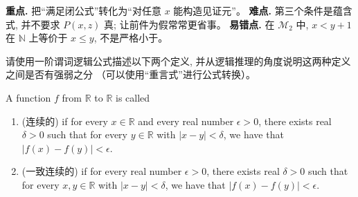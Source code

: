 \documentclass[a4paper, justified]{tufte-handout}
\begin{document}
\begin{solution}
  \begin{remark}
    \textbf{重点.} 把“满足闭公式”转化为“对任意 $x$ 能构造见证元”。
    \textbf{难点.} 第三个条件是蕴含式, 并不要求 $P(x, z)$ 真; 让前件为假常常更省事。
    \textbf{易错点.} 在 $\mathcal{M}_{2}$ 中, $x < y + 1$ 在 $\mathbb{N}$ 上等价于 $x \le y$, 不是严格小于。
  \end{remark}
\end{solution}

\newpage
\begin{problem}
  请使用一阶谓词逻辑公式描述以下两个定义,
  并从逻辑推理的角度说明这两种定义之间是否有强弱之分
  （可以使用``重言式''进行公式转换）。

  A function $f$ from $\mathbb{R}$ to $\mathbb{R}$ is called
  \begin{enumerate}[(1)]
    \setlength{\itemsep}{10pt}
    \item {} (连续的) if
      for every $x \in \mathbb{R}$
      and every real number $\epsilon > 0$,
      there exists real $\delta > 0$ such that
      for every $y \in \mathbb{R}$ with $|x - y| < \delta$,
      we have that $|f(x) -  f(y)|< \epsilon$.
    \item {} (一致连续的) if
      for every real number $\epsilon > 0$,
      there exists real $\delta > 0$ such that
      for every $x, y \in \mathbb{R}$ with $|x - y| < \delta$,
      we have that $|f(x) -  f(y)|< \epsilon$.
  \end{enumerate}
\end{problem}
\end{document}
